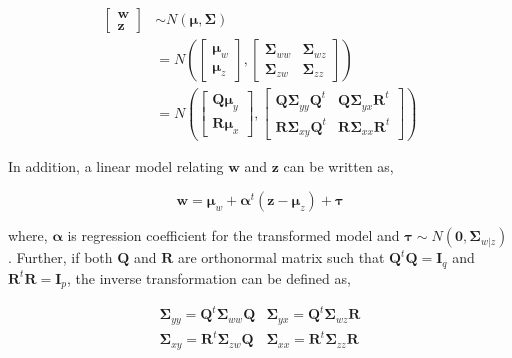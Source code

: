 \documentclass[12pt,A4paper,authoryear]{elsarticle} %
\theoremstyle{definition}
\theoremstyle{definition}
\theoremstyle{remark}
\begin{document}
\begin{align}
  \begin{bmatrix}\mathbf{w} \\ 
  \mathbf{z}\end{bmatrix}  & \sim N \left(\boldsymbol{\mu}, \boldsymbol{\Sigma}\right) \\
  &= N \left(
    \begin{bmatrix}
      \boldsymbol{\mu}_w \\ \boldsymbol{\mu}_z
    \end{bmatrix},
    \begin{bmatrix}
      \boldsymbol{\Sigma}_{ww} & \boldsymbol{\Sigma}_{wz} \\
      \boldsymbol{\Sigma}_{zw} & \boldsymbol{\Sigma}_{zz}
    \end{bmatrix} \right) \nonumber \\
  &= N \left(
    \begin{bmatrix}
      \boldsymbol{Q\mu}_y \\
      \boldsymbol{R\mu}_x
    \end{bmatrix},
    \begin{bmatrix}
      \boldsymbol{Q\Sigma}_{yy}\boldsymbol{Q}^t & \boldsymbol{Q\Sigma}_{yx}\mathbf{R}^t \\
      \boldsymbol{R\Sigma}_{xy}\boldsymbol{Q}^t & \boldsymbol{R\Sigma}_{xx}\mathbf{R}^t
    \end{bmatrix}
  \right)
  \label{eq:model3}
\end{align}

In addition, a linear model relating \(\mathbf{w}\) and \(\mathbf{z}\)
can be written as,

\begin{equation}
\mathbf{w} =    \boldsymbol{\mu}_w + \boldsymbol{\alpha}^t \left(\mathbf{z} - \boldsymbol{\mu}_z\right) + \boldsymbol{\tau}
\label{eq:latent-model}
\end{equation}

where, \(\boldsymbol{\alpha}\) is regression coefficient for the
transformed model and
\(\boldsymbol{\tau} \sim N\left(\mathbf{0}, \boldsymbol{\Sigma}_{w|z}\right)\).
Further, if both \(\mathbf{Q}\) and \(\mathbf{R}\) are orthonormal
matrix such that \(\mathbf{Q}^t\mathbf{Q} = \mathbf{I}_q\) and
\(\mathbf{R}^t\mathbf{R} = \mathbf{I}_p\), the inverse transformation
can be defined as,

\begin{equation}
  \begin{matrix}
    \boldsymbol{\Sigma}_{yy} = \mathbf{Q}^t \boldsymbol{\Sigma}_{ww} \mathbf{Q} &
    \boldsymbol{\Sigma}_{yx} = \mathbf{Q}^t \boldsymbol{\Sigma}_{wz} \mathbf{R} \\
    \boldsymbol{\Sigma}_{xy} = \mathbf{R}^t \boldsymbol{\Sigma}_{zw} \mathbf{Q} &
    \boldsymbol{\Sigma}_{xx} = \mathbf{R}^t \boldsymbol{\Sigma}_{zz} \mathbf{R}
  \end{matrix}
  \label{eq:cov-yx-wz}
\end{equation}
\end{document}
